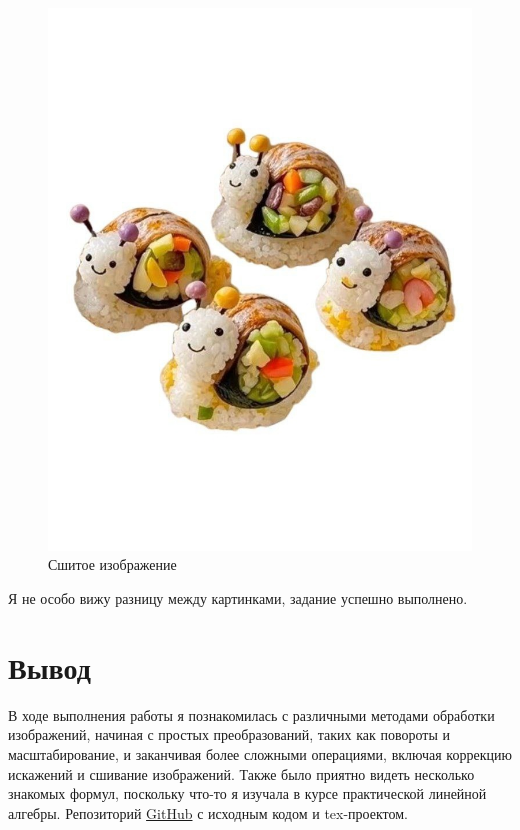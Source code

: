 \documentclass[a4paper,12pt]{article}
\begin{document}
\begin{figure}[H]
\begin{minipage}{0.48\textwidth}
        \includegraphics[width=\linewidth]{lab2/task3/stitchedImage.jpg}
        \caption{Сшитое изображение}
        \label{fig:reflect_oy}
    \end{minipage}
\end{figure}

Я не особо вижу разницу между картинками, задание успешно выполнено.


\section{Вывод}
В ходе выполнения работы я познакомилась с различными методами обработки изображений, начиная с простых преобразований, таких как повороты и масштабирование, и заканчивая более сложными операциями, включая коррекцию искажений и сшивание изображений. Также было приятно видеть несколько знакомых формул, поскольку что-то я изучала в курсе практической линейной алгебры. Репозиторий \href{https://github.com/decadeos/texViz/tree/main/lab2}{GitHub} с исходным кодом и tex-проектом.
\end{document}
